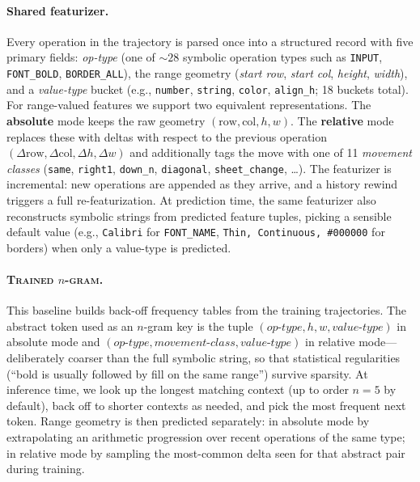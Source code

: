 \documentclass{article}
\newcommand{\op}[1]{\texttt{\small #1}}
\theoremstyle{plain}
\theoremstyle{definition}
\theoremstyle{remark}
\begin{document}
\paragraph{Shared featurizer.}
Every operation in the trajectory is parsed once into a structured record with five primary fields: \textit{op-type} (one of $\sim 28$ symbolic operation types such as \op{INPUT}, \op{FONT\_BOLD}, \op{BORDER\_ALL}), the range geometry (\textit{start row}, \textit{start col}, \textit{height}, \textit{width}), and a \textit{value-type} bucket (e.g., \op{number}, \op{string}, \op{color}, \op{align\_h}; 18 buckets total).
For range-valued features we support two equivalent representations.
The \textbf{absolute} mode keeps the raw geometry $(\text{row}, \text{col}, h, w)$.
The \textbf{relative} mode replaces these with deltas with respect to the previous operation $(\Delta\text{row}, \Delta\text{col}, \Delta h, \Delta w)$ and additionally tags the move with one of 11 \textit{movement classes} (\op{same}, \op{right1}, \op{down\_n}, \op{diagonal}, \op{sheet\_change}, \ldots).
The featurizer is incremental: new operations are appended as they arrive, and a history rewind triggers a full re-featurization.
At prediction time, the same featurizer also reconstructs symbolic strings from predicted feature tuples, picking a sensible default value (e.g., \op{Calibri} for \op{FONT\_NAME}, \op{Thin, Continuous, \#000000} for borders) when only a value-type is predicted.


\paragraph{\textsc{Trained $n$-gram}.}
This baseline builds back-off frequency tables from the training trajectories.
The abstract token used as an $n$-gram key is the tuple $(\textit{op-type}, h, w, \textit{value-type})$ in absolute mode and $(\textit{op-type}, \textit{movement-class}, \textit{value-type})$ in relative mode---deliberately coarser than the full symbolic string, so that statistical regularities (``bold is usually followed by fill on the same range'') survive sparsity.
At inference time, we look up the longest matching context (up to order $n{=}5$ by default), back off to shorter contexts as needed, and pick the most frequent next token.
Range geometry is then predicted separately: in absolute mode by extrapolating an arithmetic progression over recent operations of the same type; in relative mode by sampling the most-common delta seen for that abstract pair during training.
\end{document}
